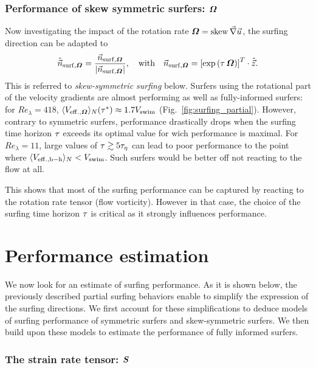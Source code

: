 \subsubsection{Performance of skew symmetric surfers: $\boldsymbol{\varOmega}$}

Now investigating the impact of the rotation rate $\boldsymbol{\varOmega} = \operatorname{skew} \vec{\nabla} \vec{u}$, the surfing direction can be adapted to
\begin{equation}\label{turb:eq:surf_partial_asym}
	\hat{\vec{n}}_{\mathrm{surf}, \boldsymbol{\varOmega}} = \frac{\vec{n}_{\mathrm{surf}, \boldsymbol{\varOmega}}}{\lvert\vec{n}_{\mathrm{surf}, \boldsymbol{\varOmega}}\rvert}, \quad \text{with} \quad \vec{n}_{\mathrm{surf}, \boldsymbol{\varOmega}} = \left[ \exp \left( \tau \, \boldsymbol{\varOmega} \right) \right]^T \cdot \hat{\vec{z}}.
\end{equation}
This is referred to \textit{skew-symmetric surfing} below.
Surfers using the rotational part of the velocity gradients are almost performing as well as fully-informed surfers: for $\mathit{Re}_{\lambda} = 418$, $\langle V_{\mathrm{eff.}, \boldsymbol{\varOmega}} \rangle_{N}(\tau^*) \approx 1.7 V_{\mathrm{swim}}$ (Fig.~\ref{fig:surfing_partial}).
However, contrary to symmetric surfers, performance drastically drops when the surfing time horizon $\tau$ exceeds its optimal value for wich performance is maximal.
For $\mathit{Re}_{\lambda} = 11$, large values of $\tau \gtrsim 5\tau_{\eta}$ can lead to poor performance to the point where $\langle V_{\mathrm{eff.}, \mathrm{b-h}} \rangle_{N} < V_{\mathrm{swim}}$. 
Such surfers would be better off not reacting to the flow at all.

This shows that most of the surfing performance can be captured by reacting to the rotation rate tensor (flow vorticity).
However in that case, the choice of the surfing time horizon $\tau$ is critical as it strongly influences performance.

\section{Performance estimation}\label{sec:perf_estimation}

We now look for an estimate of surfing performance.
As it is shown below, the previously described partial surfing behaviors enable to simplify the expression of the surfing directions.
We first account for these simplifications to deduce models of surfing performance of symmetric surfers and skew-symmetric surfers.
We then build upon these models to estimate the performance of fully informed surfers.

\subsubsection{The strain rate tensor: $\boldsymbol{S}$}

